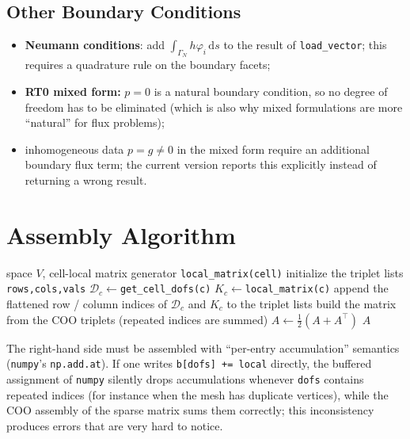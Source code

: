 \documentclass[11pt,oneside]{book}
\theoremstyle{definition}
\theoremstyle{plain}
\newenvironment{caution}{%
  \begin{tcolorbox}[colback=orange!5,colframe=orange!55,title=Caution,fonttitle=\bfseries]%
}{%
  \end{tcolorbox}%
}
\newcommand{\mosica}{\textsf{MosicaFE}}
\newcommand{\code}[1]{\texttt{#1}}
\newcommand{\dif}{\,\mathrm{d}}
\begin{document}
\subsection{Other Boundary Conditions}

\begin{itemize}[itemsep=0.2em]
  \item \textbf{Neumann conditions}: add $\int_{\Gamma_N}h\varphi_i\dif s$ to the
        result of \code{load\_\allowbreak vector}; this requires a quadrature rule on the
        boundary facets;
  \item \textbf{RT0 mixed form:} $p=0$ is a natural boundary condition, so no degree
        of freedom has to be eliminated (which is also why mixed formulations are
        more ``natural'' for flux problems);
  \item inhomogeneous data $p=g\ne0$ in the mixed form require an additional boundary
        flux term; the current version reports this explicitly instead of returning a
        wrong result.
\end{itemize}

\section{Assembly Algorithm}

\begin{algorithm}[htbp]
\caption{Global assembly (\code{BaseFESpace.\_assemble} in \mosica{})}
\label{alg:assembly}
\begin{algorithmic}[1]
\REQUIRE space $V$, cell-local matrix generator \code{local\_\allowbreak matrix(cell)}
\STATE initialize the triplet lists \code{rows,\allowbreak  cols,\allowbreak  vals}
    \STATE $\mathcal{D}_c\leftarrow$\code{get\_\allowbreak cell\_\allowbreak dofs(c)}
    \STATE $K_c\leftarrow$\code{local\_\allowbreak matrix(c)}
    \STATE append the flattened row / column indices of $\mathcal{D}_c$ and $K_c$ to
           the triplet lists
\ENDFOR
\STATE build the matrix from the COO triplets (repeated indices are summed)
    \STATE $A\leftarrow\frac12(A+A^{\top})$
\ENDIF
\RETURN $A$
\end{algorithmic}
\end{algorithm}

\begin{caution}
The right-hand side must be assembled with ``per-entry accumulation'' semantics
(\code{numpy}'s \code{np.add.at}). If one writes \code{b[dofs] += local} directly,
the buffered assignment of \code{numpy} silently drops accumulations whenever
\code{dofs} contains repeated indices (for instance when the mesh has duplicate
vertices), while the COO assembly of the sparse matrix sums them correctly; this
inconsistency produces errors that are very hard to notice.
\end{caution}
\end{document}
